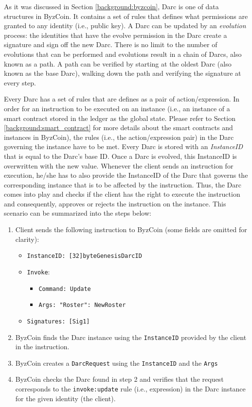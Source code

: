 As it was discussed in Section \ref{background:byzcoin}, Darc is one of data structures in ByzCoin. It contains a set of rules that defines what permissions are granted to any identity (i.e., public key). A Darc can be updated by an \textit{evolution} process: the identities that have the evolve permission in the Darc create a signature and sign off the new Darc. There is no limit to the number of evolutions that can be performed and evolutions result in a chain of Darcs, also known as a path. A path can be verified by starting at the oldest Darc (also known as the base Darc), walking down the path and verifying the signature at every step.


Every Darc has a set of rules that are defines as a pair of action/expression. In order for an instruction to be executed on an instance (i.e., an instance of a smart contract stored in the ledger as the global state. Please refer to Section \ref{background:smart_contract} for more details about the smart contracts and instances in ByzCoin), the rules (i.e., the action/expression pair) in the Darc governing the instance have to be met. Every Darc is stored with an \textit{InstanceID} that is equal to the Darc's base ID. Once a Darc is evolved, this InstanceID is overwritten with the new value. Whenever the client sends an instruction for execution, he/she has to also provide the InstanceID of the Darc that governs the corresponding instance that is to be affected by the instruction. Thus, the Darc comes into play and checks if the client has the right to execute the instruction and consequently, approves or rejects the instruction on the instance. This scenario can be summarized into the steps below:

\begin{enumerate}
    \item Client sends the following instruction to ByzCoin (some fields are omitted for clarity):
    \begin{itemize}
        \item \texttt{InstanceID: [32]byte{GenesisDarcID}}
        \item \texttt{Invoke}:
        \begin{itemize}
            \item \texttt{Command: Update}
            \item \texttt{Args: {"Roster": NewRoster}}
        \end{itemize}
        \item \texttt{Signatures: [Sig1]}
    \end{itemize}

    \item ByzCoin finds the Darc instance using the \texttt{InstanceID} provided by the client in the instruction.
    \item ByzCoin creates a \texttt{DarcRequest} using the \texttt{InstanceID} and the \texttt{Args}
    \item ByzCoin checks the Darc found in step 2 and verifies that the request corresponds to the \texttt{invoke:update} rule (i.e., expression) in the Darc instance for the given identity (the client).
\end{enumerate}

